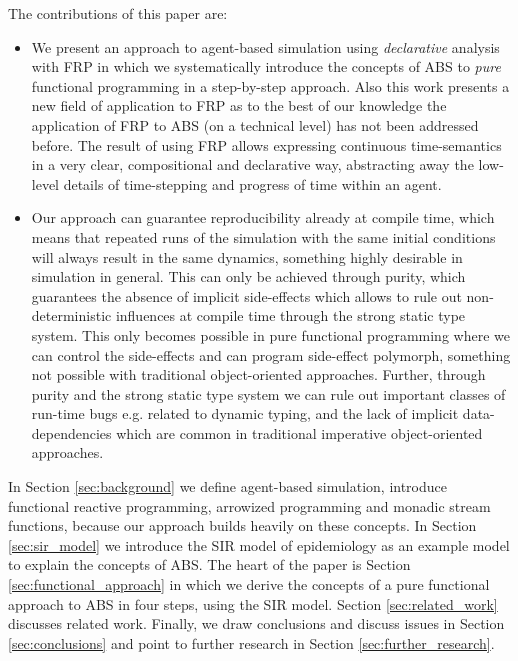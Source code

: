 The contributions of this paper are:
\begin{itemize}
	\item We present an approach to agent-based simulation using \textit{declarative} analysis with FRP in which we systematically introduce the concepts of ABS to \textit{pure} functional programming in a step-by-step approach. Also this work presents a new field of application to FRP as to the best of our knowledge the application of FRP to ABS (on a technical level) has not been addressed before. The result of using FRP allows expressing continuous time-semantics in a very clear, compositional and declarative way, abstracting away the low-level details of time-stepping and progress of time within an agent.
	
	\item Our approach can guarantee reproducibility already at compile time, which means that repeated runs of the simulation with the same initial conditions will always result in the same dynamics, something highly desirable in simulation in general. This can only be achieved through purity, which guarantees the absence of implicit side-effects which allows to rule out non-deterministic influences at compile time through the strong static type system. This only becomes possible in pure functional programming where we can control the side-effects and can program side-effect polymorph, something not possible with traditional object-oriented approaches. Further, through purity and the strong static type system we can rule out important classes of run-time bugs e.g. related to dynamic typing, and the lack of implicit data-dependencies which are common in traditional imperative object-oriented approaches.
\end{itemize}

In Section \ref{sec:background} we define agent-based simulation, introduce functional reactive programming, arrowized programming and monadic stream functions, because our approach builds heavily on these concepts. In Section \ref{sec:sir_model} we introduce the SIR model of epidemiology as an example model to explain the concepts of ABS. The heart of the paper is Section \ref{sec:functional_approach} in which we derive the concepts of a pure functional approach to ABS in four steps, using the SIR model. Section \ref{sec:related_work} discusses related work. Finally, we draw conclusions and discuss issues in Section \ref{sec:conclusions} and point to further research in Section \ref{sec:further_research}.

